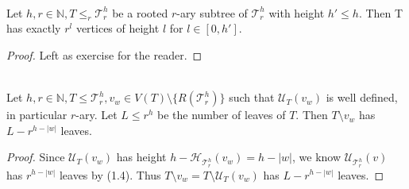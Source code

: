 \documentclass[12pt]{article}
\newcommand{\T}[0]{{\mathcal{T}_r^h}}
\newenvironment{statement3}[3]{\begin{trivlist}
\item[\hskip \labelsep {\bfseries #1}\hskip \labelsep {\bfseries #2} {#3}\textbf{.}]}{\end{trivlist}}
\begin{document}
\begin{statement3}{(1.4)}{Proposition}{(Number of nodes in rooted r-ary subtrees)}\strut\\[2pt]
    Let $h,r \in \mathbb{N}, T \leq_r \T$ be a rooted $r$-ary subtree of $\T$ with height $h' \leq h$.
    Then T has exactly $r^l$ vertices of height $l$ for $l \in [0,h']$.
    \begin{proof}
        Left as exercise for the reader.
    \end{proof}
\end{statement3}

\begin{statement3}{(1.5)}{Corollary}{(Number of leafs of $T \setminus v$)}\strut\\[2pt]
    Let $h,r \in \mathbb{N}, T \leq \T, v_w \in V(T) \setminus \{R(\T)\}$ such that
    $\mathcal{U}_T(v_w)$ is well defined, in particular $r$-ary.
    Let $L \leq r^h$ be the number of leaves of $T$. Then $T \setminus v_w$ has $L - r^{h-|w|}$
    leaves.
    \begin{proof}
        Since $\mathcal{U}_{T}(v_w)$ has height $h-\mathcal{H}_\T(v_w) = h - |w|$,
        we know $\mathcal{U}_\T(v)$ has $r^{h-|w|}$ leaves by (1.4).
        Thus $T \setminus v_w = T \setminus \mathcal{U}_T(v_w)$ has $L - r^{h-|w|}$ leaves.
    \end{proof}
\end{statement3}
\end{document}
